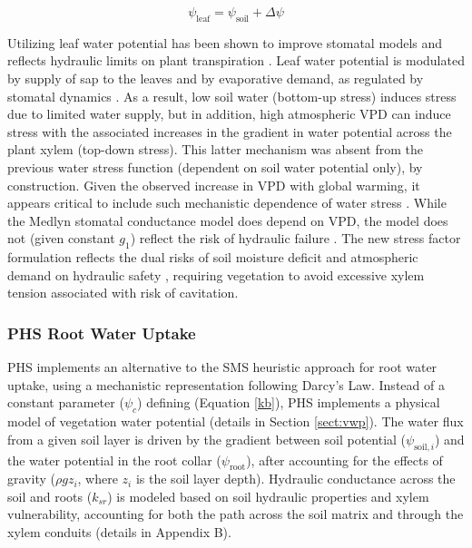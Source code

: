 \documentclass[draft,linenumbers]{agujournal}
\begin{document}
        \begin{linenomath*}
    \begin{equation}
\psi_{\text{leaf}} = \psi_{\text{soil}} + \Delta\psi
    \label{eq:fwphs}
    \end{equation}
    \end{linenomath*}
    
    Utilizing leaf water potential has been shown to improve stomatal models \citep{anderegg2017} and reflects hydraulic limits on plant transpiration \citep{manzoni2013,sperry1998}.
    Leaf water potential is modulated by supply of sap to the leaves and by evaporative demand, as regulated by stomatal dynamics \citep{sperry2015}. 
    As a result, low soil water (bottom-up stress) induces stress due to limited water supply, but in addition, high atmospheric VPD can induce stress with the associated increases in the gradient in water potential across the plant xylem (top-down stress). 
    This latter mechanism was absent from the previous water stress function (dependent on soil water potential only), by construction.
    Given the observed increase in VPD with global warming, it appears critical to include such mechanistic dependence of water stress \citep{novick2016b}.
    While the Medlyn stomatal conductance model does depend on VPD, the model does not (given constant $g_1$) reflect the risk of hydraulic failure \citep{zhou2013}.
    The new stress factor formulation reflects the dual risks of soil moisture deficit and atmospheric demand on hydraulic safety \citep{williams2013}, requiring vegetation to avoid excessive xylem tension associated with risk of cavitation.

    \subsubsection{PHS Root Water Uptake}
        \label{sect:phsrwu}
    
    PHS implements an alternative to the SMS heuristic approach for root water uptake, using a mechanistic representation following Darcy's Law.
    Instead of a constant parameter ($\psi_c$) defining  (Equation \ref{kb}), PHS implements a physical model of vegetation water potential (details in Section \ref{sect:vwp}).
    The water flux from a given soil layer is driven by the gradient between soil potential ($\psi_{\text{soil},i}$) and the water potential in the root collar ($\psi_{\text{root}}$), 
    after accounting for the effects of gravity ($\rho g z_i$, where $z_i$ is the soil layer depth).
    Hydraulic conductance across the soil and roots ($k_{sr}$) is modeled based on soil hydraulic properties and xylem vulnerability, 
    accounting for both the path across the soil matrix and through the xylem conduits (details in Appendix B).
    
\end{document}
